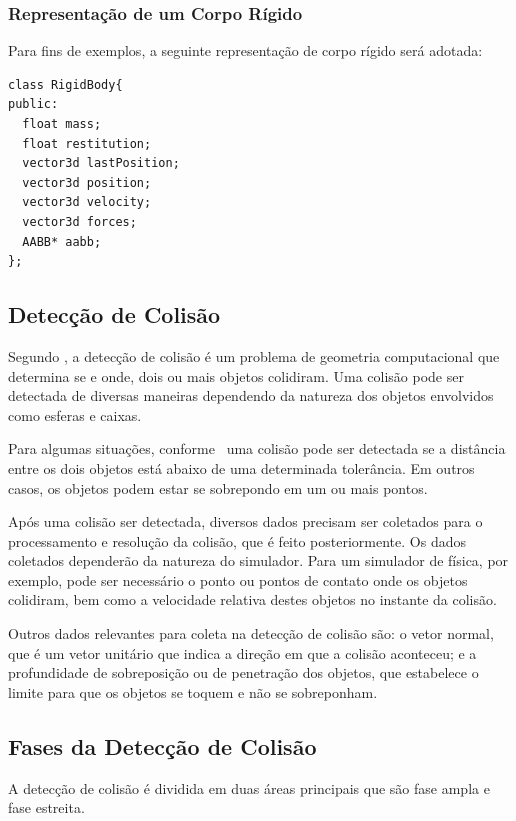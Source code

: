 \subsubsection{Representação de um Corpo Rígido}

Para fins de exemplos, a seguinte representação de corpo rígido será adotada:

\begin{lstlisting}[frame=single,caption=Exemplo de corpo rígido\label{code:RigidBody}]
class RigidBody{
public:
  float mass;
  float restitution;
  vector3d lastPosition;
  vector3d position;
  vector3d velocity;
  vector3d forces;
  AABB* aabb;
};
\end{lstlisting}

\subsection{Detecção de Colisão}
Segundo , a detecção de colisão é um problema de geometria computacional que
determina se e onde, dois ou mais objetos colidiram.
Uma colisão pode ser detectada de diversas maneiras dependendo da natureza dos
objetos envolvidos como esferas e caixas.

Para algumas situações, conforme~ uma colisão pode ser detectada se a distância entre os dois objetos está abaixo de uma
determinada tolerância. Em outros casos, os objetos podem estar se sobrepondo em um ou mais pontos.

Após uma colisão ser detectada, diversos dados precisam ser coletados para o processamento e resolução da colisão, que é feito posteriormente. Os dados coletados dependerão da natureza do simulador. Para um simulador de física, por exemplo, pode ser necessário o ponto ou pontos de contato onde os objetos colidiram, bem como a velocidade relativa destes objetos no instante da colisão.

Outros dados relevantes para coleta na detecção de colisão são: o vetor normal, que é um vetor unitário que indica a direção em que a colisão aconteceu; e  a profundidade de sobreposição ou de penetração dos objetos, que estabelece o limite para que os objetos se toquem e não se sobreponham.

\subsection{Fases da Detecção de Colisão}
A detecção de colisão é dividida em duas áreas principais que são fase ampla e fase estreita.

